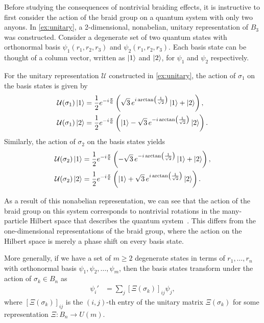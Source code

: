 Before studying the consequences of nontrivial braiding effects, it is instructive to first consider the action of the braid group on a quantum system with only two anyons. In \cref{ex:unitary}, a 2-dimensional, nonabelian, unitary representation of $B_3$ was constructed. Consider a degenerate set of two quantum states with orthonormal basis $\psi_1(r_1,r_2,r_3)$ and $\psi_2(r_1,r_2,r_3)$. Each basis state can be thought of a column vector, written as $\ket{1}$ and $\ket{2}$, for $\psi_1$ and $\psi_2$ respectively.

For the unitary representation $\mathcal{U}$ constructed in \cref{ex:unitary}, the action of $\sigma_1$ on the basis states is given by
\begin{align*}
    \mathcal{U}(\sigma_1)\ket{1} &= \frac{1}{2}e^{-i\frac{\pi}{6}}\left( \sqrt{3}\,e^{i\arctan\left( \frac{1}{\sqrt{2}} \right)}\ket{1} + \ket{2} \right), \\
    \mathcal{U}(\sigma_1)\ket{2} &= \frac{1}{2}e^{-i\frac{\pi}{6}}\left( \ket{1} - \sqrt{3}\,e^{-i\arctan\left( \frac{1}{\sqrt{2}} \right)}\ket{2} \right).
\end{align*}
Similarly, the action of $\sigma_2$ on the basis states yields
\begin{align*}
    \mathcal{U}(\sigma_2)\ket{1} &= \frac{1}{2}e^{-i\frac{\pi}{6}}\left( -\sqrt{3}\,e^{-i\arctan\left( \frac{1}{\sqrt{2}} \right)}\ket{1} + \ket{2} \right), \\
    \mathcal{U}(\sigma_2)\ket{2} &= \frac{1}{2}e^{-i\frac{\pi}{6}}\left( \ket{1} + \sqrt{3}\,e^{i\arctan\left( \frac{1}{\sqrt{2}} \right)}\ket{2} \right).
\end{align*}

As a result of this nonabelian representation, we can see that the action of the braid group on this system corresponds to nontrivial rotations in the many-particle Hilbert space that describes the quantum system~\cite{Nayak2008,Deshmukh}. This differs from the one-dimensional representations of the braid group, where the action on the Hilbert space is merely a phase shift on every basis state.

More generally, if we have a set of $m\geq 2$ degenerate states in terms of $r_1,\dots,r_n$ with orthonormal basis $\psi_1,\psi_2,\dots,\psi_m$, then the basis states transform under the action of $\sigma_k\in B_n$ as
\begin{align*}
    \psi_i' &= \sum_{j}{\left[ \Xi(\sigma_k) \right]}_{ij}\psi_j,
\end{align*}
where ${\left[ \Xi(\sigma_k) \right]}_{ij}$ is the $(i,j)$-th entry of the unitary matrix $\Xi(\sigma_k)$ for some representation $\Xi:B_n\to U(m)$.

